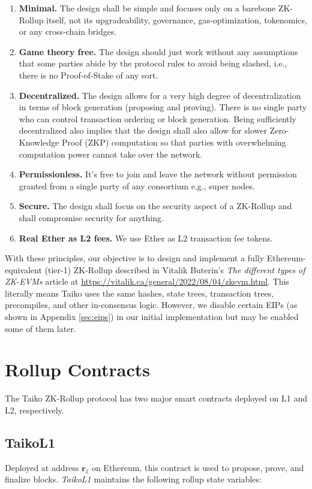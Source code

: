 \documentclass[9pt,oneside]{amsart}
\begin{document}
\begin{multicols}{2}
\begin{enumerate}
\item \textbf{Minimal.} The design shall be simple and focuses only on a barebone ZK-Rollup itself, not its upgradeability, governance, gas-optimization, tokenomics, or any cross-chain bridges.
\item  \textbf{Game theory free.} The design should just work without any assumptions that some parties abide by the protocol rules to avoid being slashed, i.e., there is no Proof-of-Stake of any sort.
\item \textbf{Decentralized.} The design allows for a very high degree of decentralization in terms of block generation (proposing and proving).  There is no single party who can control transaction ordering or block generation. Being sufficiently decentralized also implies that the design shall also allow for slower Zero-Knowledge Proof (ZKP) computation so that parties with overwhelming computation power cannot take over the network. 
\item \textbf{Permissionless.} It's free to join and leave the network without permission granted from a single party of any consortium e.g., super nodes.
\item \textbf{Secure.} The design shall focus on the security aspect of a ZK-Rollup and shall compromise security for anything.
\item \textbf{Real Ether as L2 fees.} We use Ether as L2 transaction fee tokens. 
\end{enumerate}

With these principles, our objective is to design and implement a fully Ethereum-equivalent (tier-1) ZK-Rollup described in Vitalik Buterin's \textit{The different types of ZK-EVMs} article at \url{https://vitalik.ca/general/2022/08/04/zkevm.html}. This literally means Taiko uses the same hashes, state trees, transaction trees, precompiles, and  other in-consensus logic. However, we disable certain EIPs (as shown in Appendix \ref{sec:eips}) in our initial implementation but may be enabled some of them later.

\section{Rollup Contracts}
The Taiko ZK-Rollup protocol has two major smart contracts deployed on L1 and L2, respectively.

\subsection{TaikoL1} Deployed at address $\mathbf{r_{\mathrm{1}}}$ on Ethereum, this contract is used to propose, prove, and finalize blocks. \textit{TaikoL1}  maintains the following rollup state variables:


\end{multicols}
\end{document}
